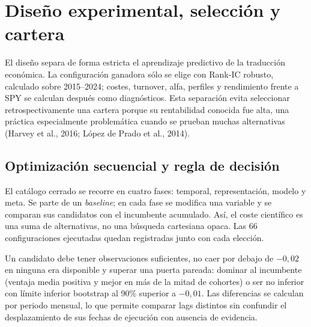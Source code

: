 \chapter{Diseño experimental, selección y cartera}
\label{chap:diseno-experimental}

El diseño separa de forma estricta el aprendizaje predictivo de la traducción económica. La
configuración ganadora sólo se elige con Rank-IC robusto, calculado sobre 2015--2024; costes,
turnover, alfa, perfiles y rendimiento frente a SPY se calculan después como diagnósticos. Esta
separación evita seleccionar retrospectivamente una cartera porque su rentabilidad conocida fue
alta, una práctica especialmente problemática cuando se prueban muchas alternativas
(Harvey et al., 2016; López de Prado et al., 2014).

\section{Optimización secuencial y regla de decisión}

El catálogo cerrado se recorre en cuatro fases: temporal, representación, modelo y meta. Se parte
de un \textit{baseline}; en cada fase se modifica una variable y se comparan sus candidatos con el
incumbente acumulado. Así, el coste científico es una suma de alternativas, no una búsqueda
cartesiana opaca. Las 66 configuraciones ejecutadas quedan registradas junto con cada elección.

Un candidato debe tener observaciones suficientes, no caer por debajo de $-0,02$ en ninguna era
disponible y superar una puerta pareada: dominar al incumbente (ventaja media positiva y mejor en
más de la mitad de cohortes) o ser no inferior con límite inferior bootstrap al 90\% superior a
$-0,01$. Las diferencias se calculan por periodo mensual, lo que permite comparar lags distintos
sin confundir el desplazamiento de sus fechas de ejecución con ausencia de evidencia.

